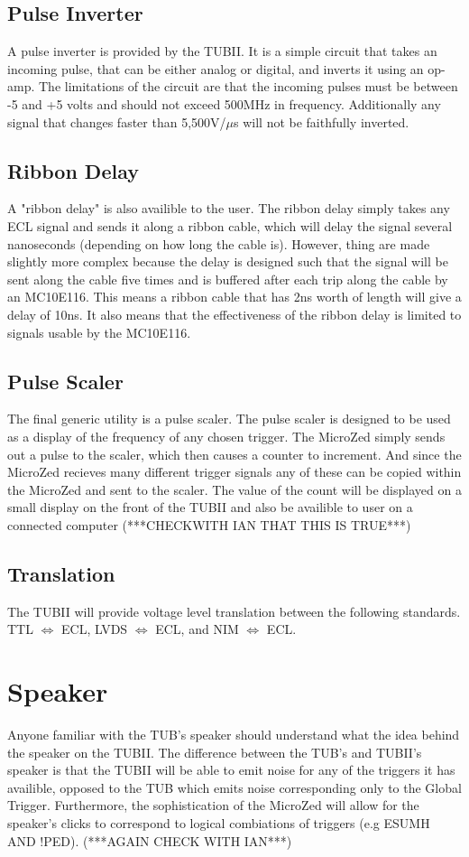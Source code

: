 \documentclass[11pt,a4paper]{article}
\begin{document}
\subsection{Pulse Inverter}
A pulse inverter is provided by the TUBII. It is a simple circuit that takes an incoming pulse, that can be either analog or digital, and inverts it using an op-amp. The limitations of the circuit are that the incoming pulses must be between -5 and +5 volts and should not exceed 500MHz in frequency. Additionally any signal that changes faster than 5,500V/$\mu$s will not be faithfully inverted.
\subsection{Ribbon Delay}
A "ribbon delay" is also availible to the user. The ribbon delay simply takes any ECL signal and sends it along a ribbon cable, which will delay the signal several nanoseconds (depending on how long the cable is). However, thing are made slightly more complex because the delay is designed such that the signal will be sent along the cable five times and is buffered after each trip along the cable by an MC10E116. This means a ribbon cable that has 2ns worth of length will give a delay of 10ns. It also means that the effectiveness of the ribbon delay is limited to signals usable by the MC10E116.

\subsection{Pulse Scaler}
The final generic utility is a pulse scaler. The pulse scaler is designed to be used as a display of the frequency of any chosen trigger. The MicroZed simply sends out a pulse to the scaler, which then causes a counter to increment. And since the MicroZed recieves many different trigger signals any of these can be copied within the MicroZed and sent to the scaler. The value of the count will be displayed on a small display on the front of the TUBII and also be availible to user on a connected computer (***CHECKWITH IAN THAT THIS IS TRUE***)
\subsection{Translation}
The TUBII will provide voltage level translation between the following standards. TTL $\Longleftrightarrow$ ECL, LVDS $\Longleftrightarrow$ ECL, and NIM $\Longleftrightarrow$ ECL.
\section{Speaker}
Anyone familiar with the TUB's speaker should understand what the idea behind the  speaker on the TUBII. The difference between the TUB's and TUBII's speaker is that the TUBII will be able to emit noise for any of the triggers it has availible, opposed to the TUB which emits noise corresponding only to the Global Trigger. Furthermore, the sophistication of the MicroZed will allow for the speaker's clicks to correspond to logical combiations of triggers (e.g ESUMH AND !PED). (***AGAIN CHECK WITH IAN***)
\end{document}
